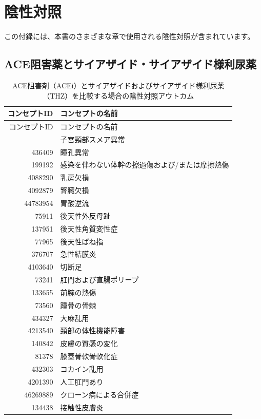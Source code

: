 \documentclass[
  11pt]{book}
\theoremstyle{definition}
\theoremstyle{definition}
\theoremstyle{definition}
\theoremstyle{definition}
\theoremstyle{remark}
\begin{document}
\chapter{陰性対照}\label{NegativeControlsAppendix}

この付録には、本書のさまざまな章で使用される陰性対照が含まれています。

\section{ACE阻害薬とサイアザイド・サイアザイド様利尿薬}\label{AceiThzNsc}

\begin{longtable}[]{@{}rl@{}}
\caption{\label{tab:AceiThzNsc} ACE阻害剤（ACEi）とサイアザイドおよびサイアザイド様利尿薬（THZ）を比較する場合の陰性対照アウトカム}\tabularnewline
\toprule\noalign{}
コンセプトID & コンセプトの名前 \\
\midrule\noalign{}
\endfirsthead
\toprule\noalign{}
コンセプトID & コンセプトの名前 \\
\midrule\noalign{}
\endhead
\bottomrule\noalign{}
\endlastfoot
434165 & 子宮頸部スメア異常 \\
436409 & 瞳孔異常 \\
199192 & 感染を伴わない体幹の擦過傷および/または摩擦熱傷 \\
4088290 & 乳房欠損 \\
4092879 & 腎臓欠損 \\
44783954 & 胃酸逆流 \\
75911 & 後天性外反母趾 \\
137951 & 後天性角質変性症 \\
77965 & 後天性ばね指 \\
376707 & 急性結膜炎 \\
4103640 & 切断足 \\
73241 & 肛門および直腸ポリープ \\
133655 & 前腕の熱傷 \\
73560 & 踵骨の骨棘 \\
434327 & 大麻乱用 \\
4213540 & 頚部の体性機能障害 \\
140842 & 皮膚の質感の変化 \\
81378 & 膝蓋骨軟骨軟化症 \\
432303 & コカイン乱用 \\
4201390 & 人工肛門あり \\
46269889 & クローン病による合併症 \\
134438 & 接触性皮膚炎 \\

\end{longtable}
\end{document}
